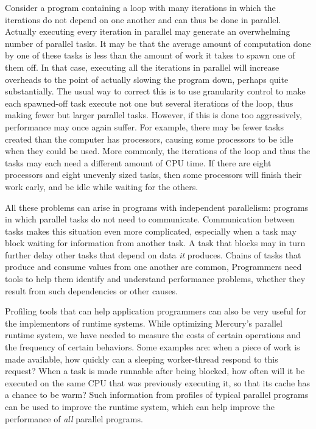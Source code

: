 Consider a program containing a loop with many iterations
in which the iterations do not depend on one another
and can thus be done in parallel.
Actually executing every iteration in parallel
may generate an overwhelming number of parallel tasks.
It may be that the average amount of computation done by one of these tasks
is less than the amount of work it takes to spawn one of them off.
In that case, executing all the iterations in parallel
will increase overheads to the point of actually slowing the program down,
perhaps quite substantially.
The usual way to correct this is to use granularity control
to make each spawned-off task execute
not one but several iterations of the loop,
thus making fewer but larger parallel tasks.
However, if this is done too aggressively,
performance may once again suffer.
For example,
there may be fewer tasks created than the computer has processors,
causing some processors to be idle when they could be used.
More commonly, the iterations of the loop and thus the tasks
may each need a different amount of CPU time.
If there are eight processors and eight unevenly sized tasks,
then some processors will finish their work early,
and be idle while waiting for the others.

All these problems can arise in programs with independent parallelism:
programs in which parallel tasks do not need to communicate.
Communication between tasks makes this situation even more complicated,
especially when a task may block waiting for information from another task.
A task that blocks may in turn further delay
other tasks that depend on data \emph{it} produces.
Chains of tasks that produce and consume values from one another are common,
Programmers need tools to help them
identify and understand performance problems,
whether they result from such dependencies or other causes.

Profiling tools that can help application programmers
can also be very useful for the implementors of runtime systems.
While optimizing Mercury's parallel runtime system,
we have needed to measure the costs of certain operations
and the frequency of certain behaviors.
Some examples are:
when a piece of work is made available,
how quickly can a sleeping worker-thread respond to this request?
When a task is made runnable after being blocked,
how often will it be executed on the same CPU that was previously executing it,
so that its cache has a chance to be warm?
Such information from profiles of typical parallel programs
can be used to improve the runtime system,
which can help improve the performance of \emph{all} parallel programs.

